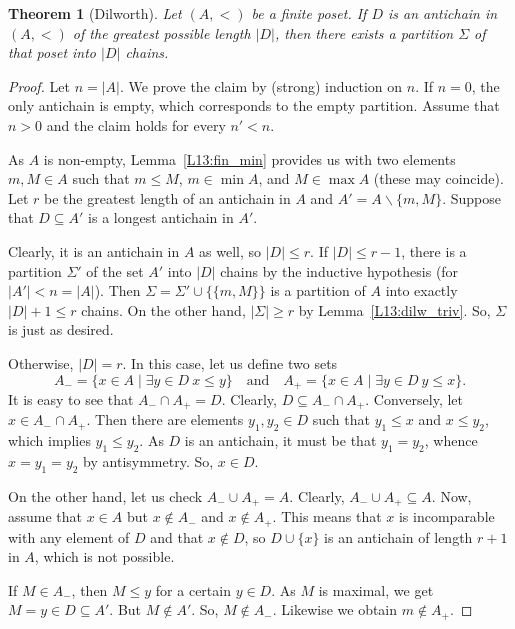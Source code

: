 \documentclass[12pt,notitlepage]{article}
\theoremstyle{plain}
\newtheorem{thm}{Theorem}[section]
\theoremstyle{definition}
\theoremstyle{plain}
\newcommand{\sbs}{\subseteq}
\renewcommand{\setminus}{\smallsetminus}
\newcommand{\1}{\mathbf{1}}
\newcommand{\0}{\mathbf{0}}
\begin{document}
\begin{thm}[Dilworth]
Let $(A, <)$ be a finite poset. If $D$ is an antichain in $(A, <)$ of the greatest possible length $|D|$, then there exists a partition $\Sigma$ of that poset into $|D|$ chains.
\end{thm}
\begin{proof}
Let $n = |A|$. We prove the claim by (strong) induction on $n$. If $n = 0$, the only antichain is empty, which corresponds to the empty partition. Assume that $n > 0$ and the claim holds for every $n' < n$.

As $A$ is non-empty, Lemma~\ref{L13:fin_min} provides us with two elements $m, M \in A$ such that $m \leq M$, $m \in \min A$, and $M \in \max A$ (these may coincide). Let $r$ be the greatest length of an antichain in $A$ and $A' = A \setminus \{ m, M \}$. Suppose that $D \sbs A'$ is a longest antichain in $A'$.

Clearly, it is an antichain in $A$ as well, so $|D| \leq r$. If $|D| \leq r - 1$, there is a partition $\Sigma'$ of the set $A'$ into $|D|$ chains by the inductive hypothesis (for $|A'| <  n =|A|$). Then $\Sigma = \Sigma' \cup \{ \{ m, M \} \}$ is a partition of $A$ into exactly $|D| + 1 \leq r$ chains. On the other hand, $|\Sigma| \geq r$ by Lemma~\ref{L13:dilw_triv}. So, $\Sigma$ is just as desired.

Otherwise, $|D| = r$. In this case, let us define two sets
$$A_{-} = \{ x \in A \mid \exists y \in D\ x \leq y  \}\quad\mbox{and}\quad A_{+} = \{ x \in A \mid \exists y \in D\ y \leq x \}.$$
It is easy to see that $A_{-} \cap A_{+} = D$. Clearly, $D \sbs A_{-} \cap A_{+}$. Conversely, let $x \in A_{-} \cap A_{+}$. Then there are elements $y_1, y_2 \in D$ such that $y_1 \leq x$ and $x \leq y_2$, which implies $y_1 \leq y_2$. As $D$ is an antichain, it must be that $y_1 = y_2$, whence $x = y_1 = y_2$ by antisymmetry. So, $x \in D$.

On the other hand, let us check $A_{-} \cup A_{+} = A$. Clearly, $A_{-} \cup A_{+} \sbs A$. Now, assume that $x \in A$ but $x \notin A_{-}$ and $x \notin A_{+}$. This means that $x$ is incomparable with any element of $D$ and that $x \notin D$, so $D \cup \{ x \}$ is an antichain of length $r + 1$ in $A$, which is not possible.

If $M \in A_{-}$, then $M \leq y$ for a certain $y \in D$. As $M$ is maximal, we get $M = y \in D \sbs A'$. But $M \notin A'$. So, $M \notin A_{-}$. Likewise we obtain $m \notin A_{+}$.


\end{proof}
\end{document}

